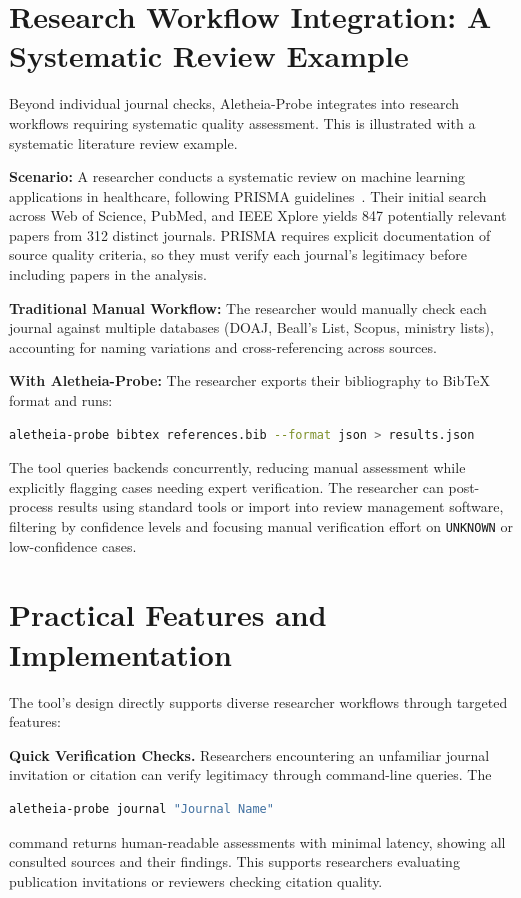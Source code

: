 \documentclass[fleqn,10pt]{SelfArx}
\begin{document}
\section{Research Workflow Integration: A Systematic Review Example}

Beyond individual journal checks, Aletheia-Probe integrates into
research workflows requiring systematic quality assessment. This is
illustrated with a systematic literature review example.

\textbf{Scenario:} A researcher conducts a systematic review on machine
learning applications in healthcare, following PRISMA
guidelines~\cite{page2021prisma}. Their initial search across Web of
Science, PubMed, and IEEE Xplore yields 847 potentially relevant
papers from 312 distinct journals. PRISMA requires explicit
documentation of source quality criteria, so they must verify each
journal's legitimacy before including papers in the analysis.

\textbf{Traditional Manual Workflow:} The researcher would manually
check each journal against multiple databases (DOAJ, Beall's List,
Scopus, ministry lists), accounting for naming variations and
cross-referencing across sources.

\textbf{With Aletheia-Probe:} The researcher exports their bibliography
to BibTeX format and runs:
\begin{lstlisting}[language=bash,basicstyle=\ttfamily\scriptsize]
aletheia-probe bibtex references.bib --format json > results.json
\end{lstlisting}
The tool queries backends concurrently, reducing manual assessment
while explicitly flagging cases needing expert verification. The
researcher can post-process results using standard tools or import
into review management software, filtering by confidence levels and
focusing manual verification effort on \texttt{UNKNOWN} or
low-confidence cases.

\section{Practical Features and Implementation}

The tool's design directly supports diverse researcher workflows
through targeted features:

\textbf{Quick Verification Checks.} Researchers encountering an
unfamiliar journal invitation or citation can verify legitimacy through
command-line queries. The
\begin{lstlisting}[language=bash,basicstyle=\ttfamily\scriptsize]
aletheia-probe journal "Journal Name"
\end{lstlisting}
command returns human-readable assessments with minimal latency, showing
all consulted sources and their findings. This supports
researchers evaluating publication invitations or reviewers checking
citation quality.
\end{document}
